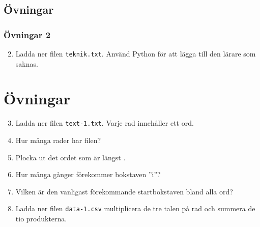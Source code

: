 \documentclass[aspectratio=169]{beamer}
\begin{document}
\subsection{Övningar}

\begin{frame}
	\frametitle{Övningar 2}
		
	\begin{enumerate}
		\setcounter{enumi}{1}
		\item Ladda ner filen \texttt{teknik.txt}. Använd Python för att lägga till den lärare som saknas.
	\end{enumerate}
	
\end{frame}

\section{Övningar}

\begin{frame}
	
	\begin{enumerate}
		\setcounter{enumi}{2}
		\item Ladda ner filen \texttt{text-1.txt}. Varje rad innehåller ett ord. 
		\item Hur många rader har filen?
		\item Plocka ut det ordet som är längst .
		\item Hur många gånger förekommer bokstaven ''i''?
		\item Vilken är den vanligast förekommande startbokstaven bland alla ord?
		\item Ladda ner filen \texttt{data-1.csv} multiplicera de tre talen på rad och summera de tio produkterna.
	\end{enumerate}
	
\end{frame}
\end{document}
